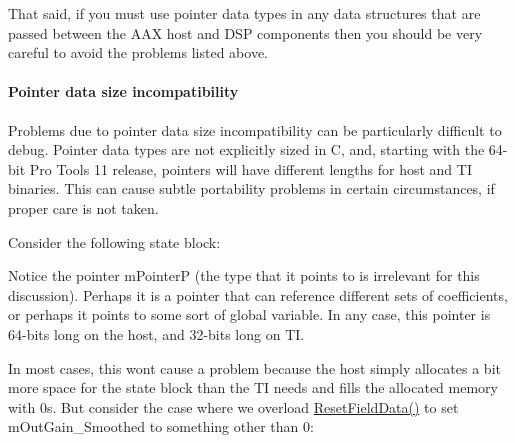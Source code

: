 That said, if you must use pointer data types in any data structures that are passed between the A\+AX host and D\+SP components then you should be very careful to avoid the problems listed above.

\hypertarget{a00832_subsubsection__pointer_data_size_incompatibility}{}\paragraph{Pointer data size incompatibility}\label{a00832_subsubsection__pointer_data_size_incompatibility}
Problems due to pointer data size incompatibility can be particularly difficult to debug. Pointer data types are not explicitly sized in C, and, starting with the 64-\/bit Pro Tools 11 release, pointers will have different lengths for host and TI binaries. This can cause subtle portability problems in certain circumstances, if proper care is not taken.

Consider the following state block\+:


\begin{DoxyCode}{0}
\DoxyCodeLine{\{}
\DoxyCodeLine{\};}
\end{DoxyCode}


Notice the pointer {\ttfamily m\+PointerP} (the type that it points to is irrelevant for this discussion). Perhaps it is a pointer that can reference different sets of coefficients, or perhaps it points to some sort of global variable. In any case, this pointer is 64-\/bits long on the host, and 32-\/bits long on TI.

In most cases, this won\textquotesingle{}t cause a problem because the host simply allocates a bit more space for the state block than the TI needs and fills the allocated memory with 0s. But consider the case where we overload \mbox{\hyperlink{a01481_a0dd675680a657de7f9d45d65d4b3bcfb}{Reset\+Field\+Data()}} to set {\ttfamily m\+Out\+Gain\+\_\+\+Smoothed} to something other than 0\+:


